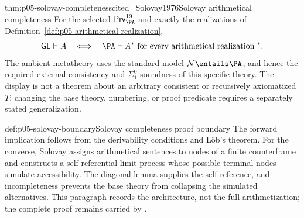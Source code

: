 \begin{hbtheorem}{thm:p05-solovay-completeness}{cited=Solovay1976}{Solovay arithmetical completeness}
For the selected \(\mathsf{Prv}^{19}_{\PA}\) and exactly the realizations of
Definition~\ref{def:p05-arithmetical-realization},
\[
 \mathsf{GL}\vdash A
 \quad\Longleftrightarrow\quad
 \PA\vdash A^*
 \text{ for every arithmetical realization }{^*}.
\]
The ambient metatheory uses the standard model
\(\mathcal N\entails\PA\), and hence the required external consistency and
\(\Sigma^0_1\)-soundness of this specific theory.  The display is not a theorem
about an arbitrary consistent or recursively axiomatized \(T\); changing the
base theory, numbering, or proof predicate requires a separately stated
generalization.
\end{hbtheorem}

\begin{proofboundary}{def:p05-solovay-boundary}{Solovay completeness proof boundary}
The forward implication follows from the derivability conditions and L\"ob's
theorem.  For the converse, Solovay assigns arithmetical sentences to nodes of
a finite counterframe and constructs a self-referential limit process whose
possible terminal nodes simulate accessibility.  The diagonal lemma supplies
the self-reference, and incompleteness prevents the base theory from
collapsing the simulated alternatives.  This paragraph records the
architecture, not the full arithmetization; the complete proof remains carried
by \cite{Solovay1976,Boolos1993}.
\end{proofboundary}

